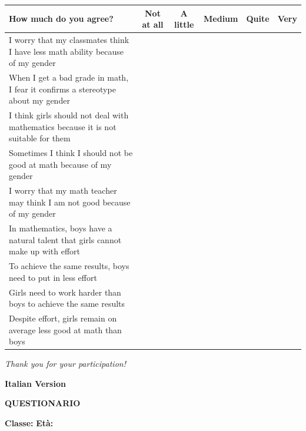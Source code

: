 \noindent
\begin{tabularx}{\textwidth}{|X|c|c|c|c|c|}
  \hline
  \textbf{How much do you agree?} & \textbf{\scriptsize Not at all} & \textbf{\scriptsize A little} & \textbf{\scriptsize Medium} & \textbf{\scriptsize Quite} & \textbf{\scriptsize Very} \\
  \hline
  I worry that my classmates think I have less math ability because of my gender & & & & & \\
  \hline
  When I get a bad grade in math, I fear it confirms a stereotype about my gender & & & & & \\
  \hline
  I think girls should not deal with mathematics because it is not suitable for them & & & & & \\
  \hline
  Sometimes I think I should not be good at math because of my gender & & & & & \\
  \hline
  I worry that my math teacher may think I am not good because of my gender & & & & & \\
  \hline
  In mathematics, boys have a natural talent that girls cannot make up with effort & & & & & \\
  \hline 
  To achieve the same results, boys need to put in less effort & & & & & \\
  \hline
  Girls need to work harder than boys to achieve the same results & & & & & \\
  \hline
  Despite effort, girls remain on average less good at math than boys & & & & & \\
  \hline
\end{tabularx}

\vspace{2cm}
\centerline{\textit{Thank you for your participation!}}

\newpage
\begin{center}
  {\Large \textbf{Italian Version}}
\end{center}

\noindent
\begin{minipage}{0.65\textwidth}
    {\Large \textbf{QUESTIONARIO}}
\end{minipage}
\hfill
\begin{minipage}{0.30\textwidth}
    \raggedleft
    \textbf{Classe:} \underline{\hspace{1cm}} \textbf{Età:} \underline{\hspace{0.8cm}}
\end{minipage}

